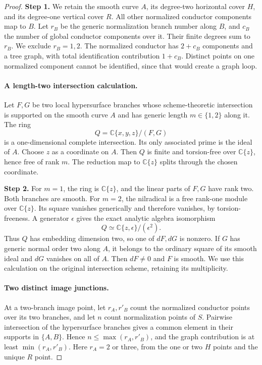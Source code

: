 \begin{proof}
\noindent\textbf{Step 1.} We retain the smooth curve $A$, its degree-two horizontal
cover $H$, and its degree-one vertical cover $R$. All other
normalized conductor components map to $B$. Let $r_B$ be
the generic normalization branch number along $B$, and
$c_B$ the number of global conductor components over it.
Their finite degrees sum to $r_B$. We exclude $r_B=1,2$.
The normalized conductor has $2+c_B$ components and a tree
graph, with total identification contribution $1+c_B$.
Distinct points on one normalized component cannot be
identified, since that would create a graph loop.

\paragraph{A length-two intersection calculation.}
Let $F,G$ be two local hypersurface branches whose
scheme-theoretic intersection is supported on the smooth
curve $A$ and has generic length $m\in\{1,2\}$ along it.
The ring
\[
                 Q=\mathbb C\{x,y,z\}/(F,G)
\]
is a one-dimensional complete intersection. Its only
associated prime is the ideal of $A$. Choose $z$ as a
coordinate on $A$. Then $Q$ is finite and torsion-free
over $\mathbb C\{z\}$, hence free of rank $m$. The
reduction map to $\mathbb C\{z\}$ splits through the
chosen coordinate.

\noindent\textbf{Step 2.} For $m=1$, the ring is $\mathbb C\{z\}$, and the linear
parts of $F,G$ have rank two. Both branches are smooth.
For $m=2$, the nilradical is a free rank-one module over
$\mathbb C\{z\}$. Its square vanishes generically and
therefore vanishes, by torsion-freeness. A generator
$\epsilon$ gives the exact analytic algebra isomorphism
\[
                    Q\simeq\mathbb C\{z,\epsilon\}/(\epsilon^2).
                                                            \tag{4.56a}
\]
Thus $Q$ has embedding dimension two, so one of $dF,dG$
is nonzero. If $G$ has generic normal order two along $A$,
it belongs to the ordinary square of its smooth ideal and
$dG$ vanishes on all of $A$. Then $dF\ne0$ and $F$ is
smooth. We use this calculation on the original intersection
scheme, retaining its multiplicity.

\paragraph{Two distinct image junctions.}
At a two-branch image point, let $r_A,r'_B$ count the
normalized conductor points over its two branches, and
let $n$ count normalization points of $S$. Pairwise
intersection of the hypersurface branches gives a common
element in their supports in $\{A,B\}$. Hence
$n\le\max(r_A,r'_B)$, and the graph contribution is at
least $\min(r_A,r'_B)$. Here $r_A=2$ or three, from the
one or two $H$ points and the unique $R$ point.


\end{proof}
